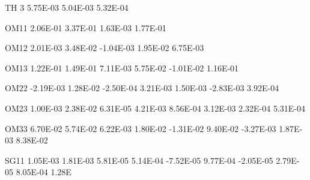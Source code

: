 \documentclass[
  11pt,
  krantz2,
  a4paper]{krantz}
\newenvironment{Shaded}{\begin{snugshade}}{\end{snugshade}}
\newcommand{\DecValTok}[1]{\textcolor[rgb]{0.00,0.00,0.81}{#1}}
\newcommand{\FloatTok}[1]{\textcolor[rgb]{0.00,0.00,0.81}{#1}}
\newcommand{\NormalTok}[1]{#1}
\theoremstyle{definition}
\theoremstyle{definition}
\theoremstyle{definition}
\theoremstyle{remark}
\begin{document}
\begin{Shaded}
\begin{Highlighting}[]
\NormalTok{TH }\DecValTok{3}    \FloatTok{5.75E{-}03}  \FloatTok{5.04E{-}03}  \FloatTok{5.32E{-}04}                                                                   
                                                                                                       
\NormalTok{OM11    }\FloatTok{2.06E{-}01}  \FloatTok{3.37E{-}01}  \FloatTok{1.63E{-}03}  \FloatTok{1.77E{-}01}                                                         
                                                                                                       
\NormalTok{OM12    }\FloatTok{2.01E{-}03}  \FloatTok{3.48E{-}02} \FloatTok{{-}1.04E{-}03}  \FloatTok{1.95E{-}02}  \FloatTok{6.75E{-}03}                                               
                                                                                                       
\NormalTok{OM13    }\FloatTok{1.22E{-}01}  \FloatTok{1.49E{-}01}  \FloatTok{7.11E{-}03}  \FloatTok{5.75E{-}02} \FloatTok{{-}1.01E{-}02}  \FloatTok{1.16E{-}01}                                     
                                                                                                       
\NormalTok{OM22   }\FloatTok{{-}2.19E{-}03}  \FloatTok{1.28E{-}02} \FloatTok{{-}2.50E{-}04}  \FloatTok{3.21E{-}03}  \FloatTok{1.50E{-}03} \FloatTok{{-}2.83E{-}03}  \FloatTok{3.92E{-}04}                           
                                                                                                       
\NormalTok{OM23    }\FloatTok{1.00E{-}03}  \FloatTok{2.38E{-}02}  \FloatTok{6.31E{-}05}  \FloatTok{4.21E{-}03}  \FloatTok{8.56E{-}04}  \FloatTok{3.12E{-}03}  \FloatTok{2.32E{-}04}  \FloatTok{5.31E{-}04}                 
                                                                                                       
\NormalTok{OM33    }\FloatTok{6.70E{-}02}  \FloatTok{5.74E{-}02}  \FloatTok{6.22E{-}03}  \FloatTok{1.80E{-}02} \FloatTok{{-}1.31E{-}02}  \FloatTok{9.40E{-}02} \FloatTok{{-}3.27E{-}03}  \FloatTok{1.87E{-}03}  \FloatTok{8.38E{-}02}       
                                                                                                       
\NormalTok{SG11    }\FloatTok{1.05E{-}03}  \FloatTok{1.81E{-}03}  \FloatTok{5.81E{-}05}  \FloatTok{5.14E{-}04} \FloatTok{{-}7.52E{-}05}  \FloatTok{9.77E{-}04} \FloatTok{{-}2.05E{-}05}  \FloatTok{2.79E{-}05}  \FloatTok{8.05E{-}04}  \FloatTok{1.28}\NormalTok{E}
                                                                                                       

\end{Highlighting}
\end{Shaded}
\end{document}

